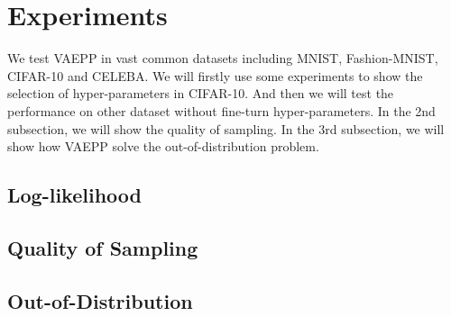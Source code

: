 \section{Experiments}
We test VAEPP in vast common datasets including MNIST, Fashion-MNIST, CIFAR-10 and CELEBA. 
We will firstly use some experiments to show the selection of hyper-parameters in CIFAR-10. And then we will test the performance on other dataset without fine-turn hyper-parameters. In the 2nd subsection, we will show the quality of sampling. In the 3rd subsection, we will show how VAEPP solve the out-of-distribution problem. 
\subsection{Log-likelihood}



\subsection{Quality of Sampling}




\subsection{Out-of-Distribution}


